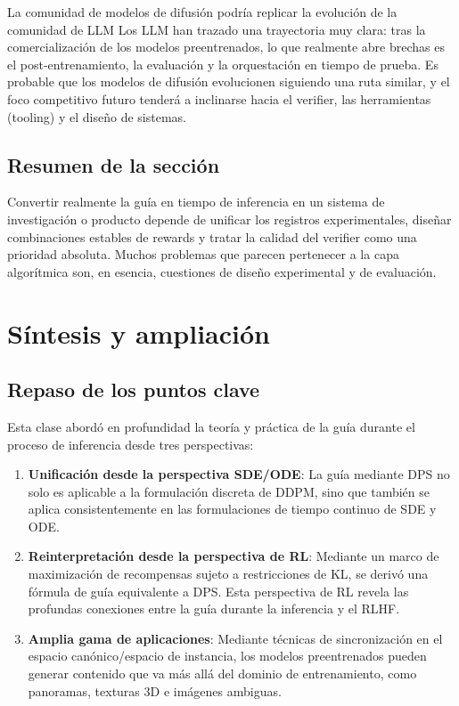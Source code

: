 \documentclass[a4paper]{article}
\begin{document}
\begin{knowledgebox}{La comunidad de modelos de difusión podría replicar la evolución de la comunidad de LLM}
Los LLM han trazado una trayectoria muy clara: tras la comercialización de los modelos preentrenados, lo que realmente abre brechas es el post-entrenamiento, la evaluación y la orquestación en tiempo de prueba. Es probable que los modelos de difusión evolucionen siguiendo una ruta similar, y el foco competitivo futuro tenderá a inclinarse hacia el verifier, las herramientas (tooling) y el diseño de sistemas.
\end{knowledgebox}

\subsection{Resumen de la sección}

Convertir realmente la guía en tiempo de inferencia en un sistema de investigación o producto depende de unificar los registros experimentales, diseñar combinaciones estables de rewards y tratar la calidad del verifier como una prioridad absoluta. Muchos problemas que parecen pertenecer a la capa algorítmica son, en esencia, cuestiones de diseño experimental y de evaluación.
\section{Síntesis y ampliación}

\subsection{Repaso de los puntos clave}

Esta clase abordó en profundidad la teoría y práctica de la guía durante el proceso de inferencia desde tres perspectivas:

\begin{enumerate}
    \item \textbf{Unificación desde la perspectiva SDE/ODE}: La guía mediante DPS no solo es aplicable a la formulación discreta de DDPM, sino que también se aplica consistentemente en las formulaciones de tiempo continuo de SDE y ODE.
    \item \textbf{Reinterpretación desde la perspectiva de RL}: Mediante un marco de maximización de recompensas sujeto a restricciones de KL, se derivó una fórmula de guía equivalente a DPS. Esta perspectiva de RL revela las profundas conexiones entre la guía durante la inferencia y el RLHF.
    \item \textbf{Amplia gama de aplicaciones}: Mediante técnicas de sincronización en el espacio canónico/espacio de instancia, los modelos preentrenados pueden generar contenido que va más allá del dominio de entrenamiento, como panoramas, texturas 3D e imágenes ambiguas.
\end{enumerate}
\end{document}
